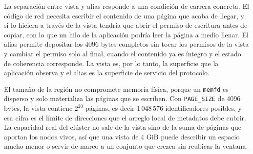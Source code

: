 La separación entre vista y alias responde a una condición de carrera concreta. El código de red necesita escribir el contenido de una página que acaba de llegar, y si lo hiciera a través de la vista tendría que abrir el permiso de escritura antes de copiar, con lo que un hilo de la aplicación podría leer la página a medio llenar. El alias permite depositar los 4096 bytes completos sin tocar los permisos de la vista y cambiar el permiso solo al final, cuando el contenido ya es íntegro y el estado de coherencia corresponde. La vista es, por lo tanto, la superficie que la aplicación observa y el alias es la superficie de servicio del protocolo.

El tamaño de la región no compromete memoria física, porque un \texttt{memfd} es disperso y solo materializa las páginas que se escriben. Con \texttt{PAGE\_SIZE} de 4096 bytes, la vista contiene $2^{20}$ páginas, es decir 1\,048\,576 identificadores posibles, y esa cifra es el límite de direcciones que el arreglo local de metadatos debe cubrir. La capacidad real del clúster no sale de la vista sino de la suma de páginas que aportan los nodos vivos, así que una vista de 4 GiB puede describir un espacio mucho menor o servir de marco a un conjunto que crezca sin reubicar la ventana.

